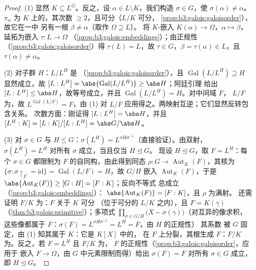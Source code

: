 \begin{proof}
(1) 显然 $K \subseteq L^G$。反之，设 $\alpha \in L
\setminus K$，我们构造 $\sigma \in G$，使 $\sigma(\alpha) \ne
\alpha$。$\pi_\alpha$ 为 $K$ 上的，其次数
$\geq 2$，且可分（$L/K$ 可分，
\cref{prop:b3:galois:galoisorder}），故它在一中
另有一根 $\beta \neq \alpha$（取作 $\Omega \supseteq L$）。
将 $K$-嵌入 $K(\alpha) \to \Omega$，$\alpha \mapsto
\beta$，延拓为嵌入 $\tau\colon L \to \Omega$
（\cref{prop:b3:galois:embeddings}）；由正规性
（\cref{prop:b3:galois:galoisorder}）得 $\tau(L) = L$，故 $\tau \in
G$，$\beta = \tau(\alpha) \in L$，且 $\tau(\alpha) \neq
\alpha$。

(2) 对子群 $H$：$L/L^H$ 是
（\cref{prop:b3:galois:galoisorder}），且
$\operatorname{Gal}(L/L^H) \supseteq H$ 显然成立，故 $[L:L^H] =
\abs{\operatorname{Gal}(L/L^H)} \geq \abs H$；阿廷引理
给出 $[L:L^H] \leq \abs H$，故等号成立，并且
$\operatorname{Gal}(L/L^H) = H$。对中间域 $F$，
$L/F$ 为，故 $L^{\operatorname{Gal}(L/F)} = F$，由 (1)
对 $L/F$ 应用得之。两映射互逆；它们显然反转包含关系。
次数方面：刚证得 $[L:L^H] = \abs H$，并且
$[L^H:K] = [L:K]/[L:L^H] = \abs G/\abs H$。

(3) 对 $\sigma \in G$ 与 $H \leq G$：$\sigma(L^H) =
L^{\sigma H\sigma^{-1}}$（直接验证）。由双射，
$\sigma(L^H) = L^H$ 对所有 $\sigma$ 成立，当且仅当 $H \trianglelefteq G$。
现设 $H \trianglelefteq G$，取 $F = L^H$：每个 $\sigma \in
G$ 都限制为 $F$ 的自同构，由此得到同态 $\rho
\colon G \to \operatorname{Aut}_K(F)$，其核为 $\{\sigma :
\sigma\restriction_F = \mathrm{id}\} = \operatorname{Gal}(L/F) =
H$，故 $G/H$ 嵌入 $\operatorname{Aut}_K(F)$，于是
$\abs{\operatorname{Aut}_K(F)} \geq [G:H] = [F:K]$；反向不等式
总成立（\cref{prop:b3:galois:embeddings}）：
$\abs{\operatorname{Aut}_K(F)} = [F:K]$，且 $\rho$ 为满射。
还需证明 $F/K$ 为：$F$ 关于 $K$ 可分
（位于可分的 $L/K$ 之内），且 $F = K(\gamma)$
（\cref{thm:b3:galois:primitive}）；多项式
$\prod_{\sigma \in G/H}\bigl(X - \sigma(\gamma)\bigr)$（对互异的像求积，
这些像都属于 $F$：$\sigma(F) =
L^{\sigma H\sigma^{-1}} = L^H = F$，由 $H$ 的正规性）
其系数
被 $G$ 固定，由 (1) 知其属于 $K$：它是 $K[X]$ 中的，
在 $F$ 上分裂，其根生成 $F$：$F/K$
为。反之，若 $F = L^H$ 且 $F/K$ 为，
$F$ 的正规性（\cref{prop:b3:galois:galoisorder}，应用于
嵌入 $F \to \Omega$，由 $G$ 中元素限制而得）给出
$\sigma(F) = F$ 对所有 $\sigma \in G$ 成立，即 $H
\trianglelefteq G$。
\end{proof}

